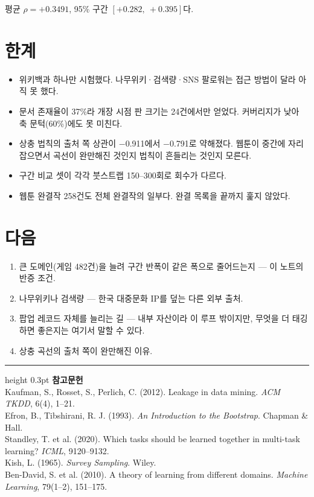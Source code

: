 \documentclass[10pt]{article}
\begin{document}
평균 $\rho=+0.3491$, 95\% 구간 $[+0.282,\ +0.395]$다.

\section{한계}

\begin{itemize}[leftmargin=1.1em,itemsep=0.15em]
\item 위키백과 하나만 시험했다. 나무위키·검색량·SNS 팔로워는 접근 방법이
      달라 아직 못 했다.
\item 문서 존재율이 37\%라 개장 시점 판 크기는 24건에서만 얻었다. 커버리지가
      낮아 축 문턱(60\%)에도 못 미친다.
\item 상충 법칙의 출처 쪽 상관이 $-$0.911에서 $-$0.791로 약해졌다. 웹툰이
      중간에 자리 잡으면서 곡선이 완만해진 것인지 법칙이 흔들리는 것인지 모른다.
\item 구간 비교 셋이 각각 붓스트랩 150--300회로 회수가 다르다.
\item 웹툰 완결작 258건도 전체 완결작의 일부다. 완결 목록을 끝까지 훑지 않았다.
\end{itemize}

\section{다음}

\begin{enumerate}[leftmargin=1.3em,itemsep=0.15em]
\item 큰 도메인(게임 482건)을 늘려 구간 반폭이 같은 폭으로 줄어드는지 --- 이
      노트의 반증 조건.
\item 나무위키나 검색량 --- 한국 대중문화 IP를 덮는 다른 외부 출처.
\item 팝업 레코드 자체를 늘리는 길 --- 내부 자산이라 이 루프 밖이지만, 무엇을
      더 태깅하면 좋은지는 여기서 말할 수 있다.
\item 상충 곡선의 출처 쪽이 완만해진 이유.
\end{enumerate}

\vspace{0.6em}
\hrule height 0.3pt
\vspace{0.5em}
{\footnotesize
\textbf{참고문헌}\\[0.3em]
Kaufman, S., Rosset, S., Perlich, C. (2012). Leakage in data mining.
\emph{ACM TKDD}, 6(4), 1--21.\\[0.15em]
Efron, B., Tibshirani, R. J. (1993). \emph{An Introduction to the Bootstrap}.
Chapman \& Hall.\\[0.15em]
Standley, T. et al. (2020). Which tasks should be learned together in multi-task
learning? \emph{ICML}, 9120--9132.\\[0.15em]
Kish, L. (1965). \emph{Survey Sampling}. Wiley.\\[0.15em]
Ben-David, S. et al. (2010). A theory of learning from different domains.
\emph{Machine Learning}, 79(1--2), 151--175.
}
\end{document}
